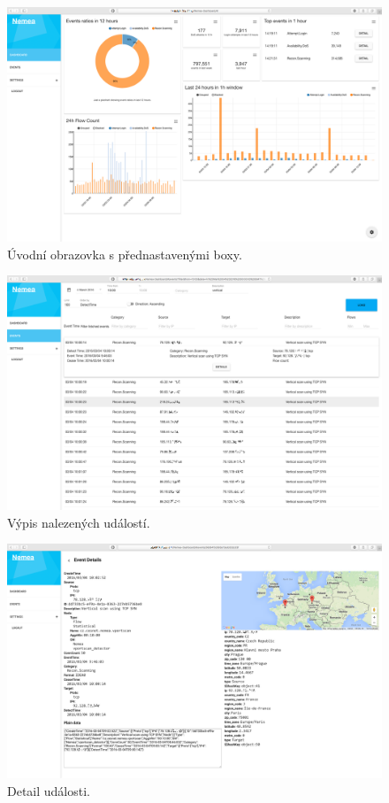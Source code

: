 \begin{figure}[ht]
    \centering
    \includegraphics[width=1\textwidth]{fig/screen_before_1.png}
    \caption{Úvodní obrazovka s přednastavenými boxy.} \label{screen:before:1}
\end{figure}

\begin{figure}[ht]
    \centering
    \includegraphics[width=1\textwidth]{fig/screen_before_2.png}
    \caption{Výpis nalezených událostí.} \label{screen:before:1}
\end{figure}

\begin{figure}[ht]
    \centering
    \includegraphics[width=1\textwidth]{fig/screen_before_3.png}
    \caption{Detail události.} \label{screen:before:1}
\end{figure}



